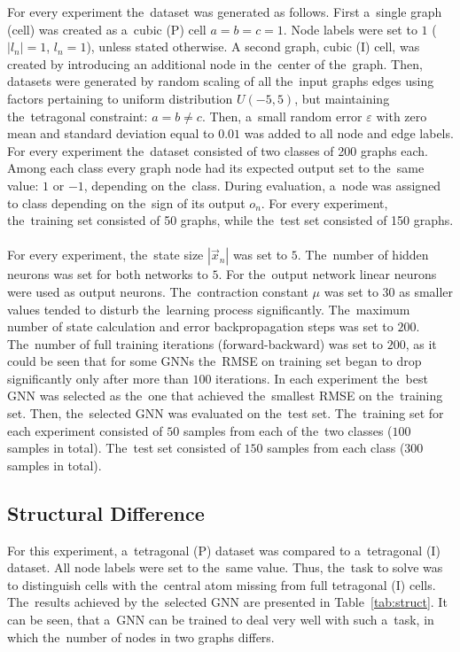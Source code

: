 \documentclass{llncs}
\begin{document}
For every experiment the~dataset was generated as follows. First a~single graph (cell) was created as a~cubic (P) cell $a = b = c = 1$. Node labels were set to $1$ ($|l_n| = 1$, $l_n = 1$), unless stated otherwise. A second graph, cubic (I) cell, was created by introducing an additional node in the~center of the~graph. Then, datasets were generated by random scaling of all the~input graphs edges using factors pertaining to uniform distribution $U(-5, 5)$, but maintaining the~tetragonal constraint: $a = b \neq c$. Then, a~small random error $\varepsilon$ with zero mean and standard deviation equal to $0.01$ was added to all node and edge labels. For every experiment the~dataset consisted of two classes of 200 graphs each. Among each class every graph node had its expected output set to the~same value: $1$ or $-1$, depending on the~class. During evaluation, a~node was assigned to class depending on the~sign of its output $o_n$. For every experiment, the~training set consisted of 50 graphs, while the~test set consisted of 150 graphs.
\\\\
For every experiment, the~state size $|\vec{x}_n|$ was set to $5$. The~number of hidden neurons was set for both networks to $5$. For the~output network linear neurons were used as output neurons. The~contraction constant $\mu$ was set to $30$ as smaller values tended to disturb the~learning process significantly. The~maximum number of state calculation and error backpropagation steps was set to $200$. The~number of full training iterations (forward-backward) was set to $200$, as it could be seen that for some GNNs the~RMSE on training set began to drop significantly only after more than $100$ iterations. In each experiment the~best GNN was selected as the~one that achieved the~smallest RMSE on the~training set. Then, the~selected GNN was evaluated on the~test set. The~training set for each experiment consisted of $50$ samples from each of the~two classes ($100$ samples in total). The~test set consisted of $150$ samples from each class ($300$ samples in total).

\subsection{Structural Difference}
For this experiment, a~tetragonal (P) dataset was compared to a~tetragonal (I) dataset. All node labels were set to the~same value. Thus, the~task to solve was to distinguish cells with the~central atom missing from full tetragonal (I) cells. The~results achieved by the~selected GNN are presented in Table~\ref{tab:struct}. It can be seen, that a~GNN can be trained to deal very well with such a~task, in which the~number of nodes in two graphs differs.
\end{document}
